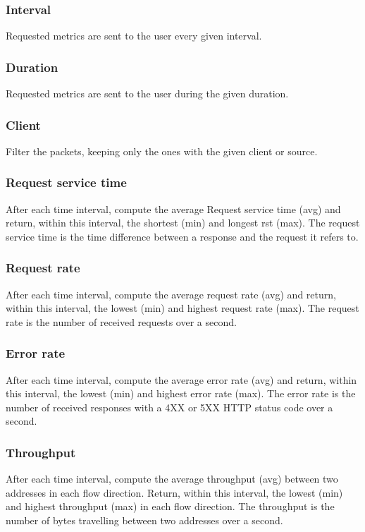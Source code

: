 \documentclass[12pt,hidelinks]{article}
\begin{document}
\subsubsection{Interval}
Requested metrics are sent to the user every given interval.

\subsubsection{Duration}
Requested metrics are sent to the user during the given duration.

\subsubsection{Client}
Filter the packets, keeping only the ones with the given client or source.

\subsubsection{Request service time}
After each time interval, compute the average Request service time (avg) and return, within this interval, the shortest (min) and longest rst (max).
The request service time is the time difference between a response and the request it refers to.

\subsubsection{Request rate}
After each time interval, compute the average request rate (avg) and return, within this interval, the lowest (min) and highest request rate (max).
The request rate is the number of received requests over a second. 

\subsubsection{Error rate}
After each time interval, compute the average error rate (avg) and return, within this interval, the lowest (min) and highest error rate (max).
The error rate is the number of received responses with a 4XX or 5XX HTTP status code over a second. 

\subsubsection{Throughput}
After each time interval, compute the average throughput (avg) between two addresses in each flow direction. 
Return, within this interval, the lowest (min) and highest throughput (max) in each flow direction.
The throughput is the number of bytes travelling between two addresses over a second. 
\end{document}
